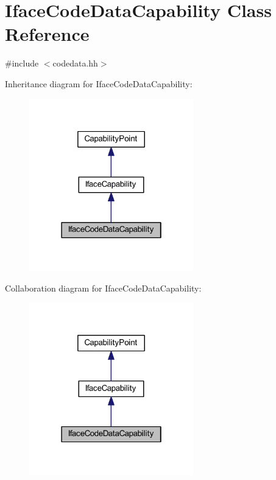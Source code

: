 \hypertarget{class_iface_code_data_capability}{}\section{Iface\+Code\+Data\+Capability Class Reference}
\label{class_iface_code_data_capability}


{\ttfamily \#include $<$codedata.\+hh$>$}



Inheritance diagram for Iface\+Code\+Data\+Capability\+:
\nopagebreak
\begin{figure}[H]
\begin{center}
\leavevmode
\includegraphics[width=202pt]{class_iface_code_data_capability__inherit__graph}
\end{center}
\end{figure}


Collaboration diagram for Iface\+Code\+Data\+Capability\+:
\nopagebreak
\begin{figure}[H]
\begin{center}
\leavevmode
\includegraphics[width=202pt]{class_iface_code_data_capability__coll__graph}
\end{center}
\end{figure}
